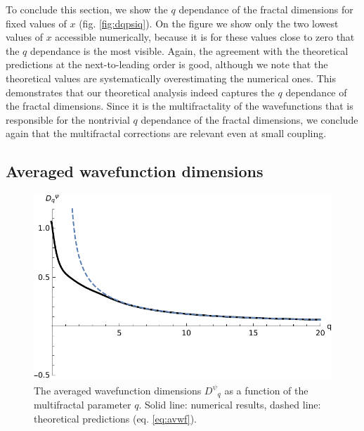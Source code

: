\documentclass[aps,prl,preprint]{revtex4-1}
\newcommand{\avwf}{\ensuremath{D^\psi}}
\begin{document}
To conclude this section, we show the $q$ dependance of the fractal dimensions for fixed values of $x$ (fig. \eqref{fig:dqpsiq}).
On the figure we show only the two lowest values of $x$ accessible numerically, because it is for these values close to zero that the $q$ dependance is the most visible. 
Again, the agreement with the theoretical predictions at the next-to-leading order is good, although we note that the theoretical values are systematically overestimating the numerical ones.
This demonstrates that our theoretical analysis indeed captures the $q$ dependance of the fractal dimensions.
Since it is the multifractality of the wavefunctions that is responsible for the nontrivial $q$ dependance of the fractal dimensions, we conclude again that the multifractal corrections are relevant even at small coupling.

\subsection{Averaged wavefunction dimensions}

\begin{figure}[htp]
	\centering
	\includegraphics[width=.5\textwidth]{img/average_wf_dimension_rho_10.pdf}
	\caption{The averaged wavefunction dimensions $\avwf_q$ as a function of the multifractal parameter $q$. Solid line: numerical results, dashed line: theoretical predictions (eq. \eqref{eq:avwf}).}
	\label{fig:avwf}
\end{figure}
\end{document}
